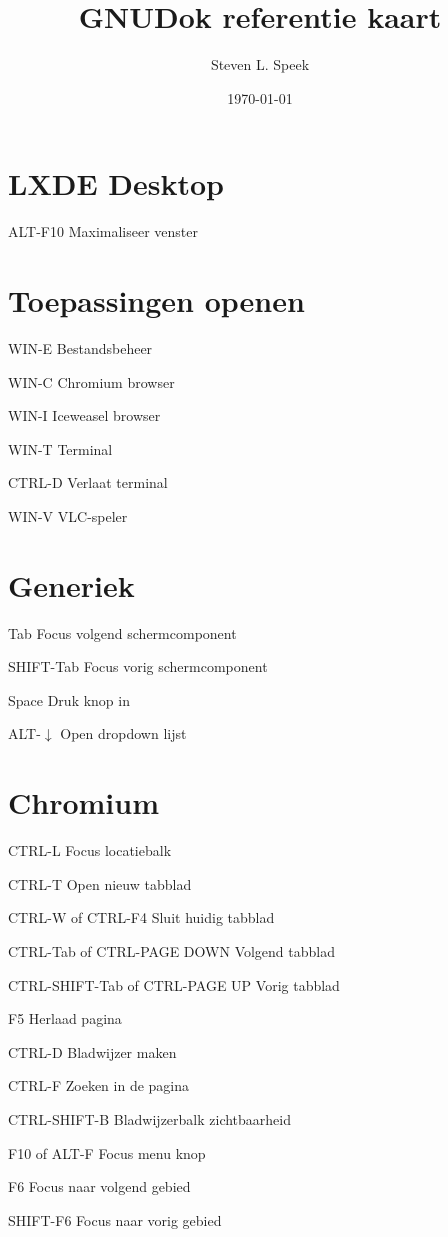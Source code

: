 \documentclass[10pt]{article}
\title{GNUDok referentie kaart}
\author{Steven L. Speek}
\date{\today{}}
\renewcommand{\maketitle}{%
{\begin{center}\Large \mythetitle\end{center}}
}
\begin{document}
\begin{multicols}{3}
	\maketitle

	\section{LXDE Desktop}
	\begin{ttdesc}[labelwidth=\widthof{\texttt{ALT-F10}}]
	\item[ALT-F10] Maximaliseer venster
	\end{ttdesc}
	\section{Toepassingen openen}
	\begin{ttdesc}[labelwidth=\widthof{\texttt{WIN-SHIFT+E}}]
	\item[WIN-E] Bestandsbeheer
	\item[WIN-C] Chromium browser
	\item[WIN-I] Iceweasel browser
	\item[WIN-T] Terminal
	\item[CTRL-D] Verlaat terminal
	\item[WIN-V] VLC-speler
	\end{ttdesc}
	\section{Generiek}
	\begin{ttdesc}[labelwidth=\widthof{\texttt{SHIFT+Tab}}]
	\item[Tab] Focus volgend schermcomponent
	\item[SHIFT-Tab] Focus vorig schermcomponent
	\item[Space] Druk knop in
	\item[ALT-$\downarrow$] Open dropdown lijst
	\end{ttdesc}
	\section{Chromium}
	\begin{ttdesc}[labelwidth=\widthof{\texttt{CTRL+SHIFT-Tab}}]
	\item[CTRL-L] Focus locatiebalk
	\item[CTRL-T] Open nieuw tabblad
	\item[CTRL-W of CTRL-F4] Sluit huidig tabblad
	\item[CTRL-Tab of CTRL-PAGE DOWN] Volgend tabblad
	\item[CTRL-SHIFT-Tab of CTRL-PAGE UP] Vorig tabblad
	\item[F5] Herlaad pagina
	\item[CTRL-D] Bladwijzer maken
	\item[CTRL-F] Zoeken in de pagina
	\item[CTRL-SHIFT-B] Bladwijzerbalk zichtbaarheid
	\item[F10 of ALT-F] Focus menu knop
	\item[F6] Focus naar volgend gebied
	\item[SHIFT-F6] Focus naar vorig gebied
	\end{ttdesc}

\end{multicols}
\end{document}
